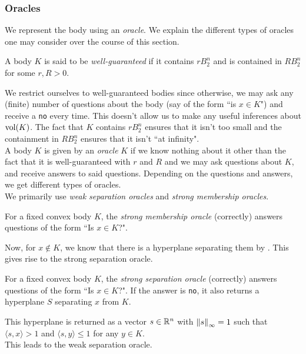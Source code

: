 \subsubsection{Oracles}

We represent the body using an \textit{oracle}. We explain the different types of oracles one may consider over the course of this section.

\begin{definition}
A body $K$ is said to be \textit{well-guaranteed} if it contains $r B_2^n$ and is contained in $R B_2^n$ for some $r,R>0$.
\end{definition}

We restrict ourselves to well-guaranteed bodies since otherwise, we may ask any (finite) number of questions about the body (say of the form ``is $x\in K$") and receive a \texttt{no} every time. This doesn't allow us to make any useful inferences about $\operatorname{vol}(K)$. The fact that $K$ contains $r B_2^n$ ensures that it isn't too small and the containment in $R B_2^n$ ensures that it isn't ``at infinity".\\

A body $K$ is given by an \textit{oracle} $K$ if we know nothing about it other than the fact that it is well-guaranteed with $r$ and $R$ and we may ask questions about $K$, and receive answers to said questions. Depending on the questions and answers, we get different types of oracles.\\
We primarily use \textit{weak separation oracles} and \textit{strong membership oracles}.

\begin{definition}
For a fixed convex body $K$, the \textit{strong membership oracle} (correctly) answers questions of the form ``Is $x\in K$?".
\end{definition}

Now, for $x\not\in K$, we know that there is a hyperplane separating them by . This gives rise to the strong separation oracle.

\begin{definition}
For a fixed convex body $K$, the \textit{strong separation oracle} (correctly) answers questions of the form ``Is $x\in K$?". If the answer is \texttt{no}, it also returns a hyperplane $S$ separating $x$ from $K$.
\end{definition}
This hyperplane is returned as a vector $s\in\mathbb{R}^n$ with $\left\lVert s\right\rVert_\infty=1$ such that $\langle s,x\rangle > 1$ and $\langle s,y\rangle\leq 1$ for any $y\in K$.\\
This leads to the weak separation oracle.

